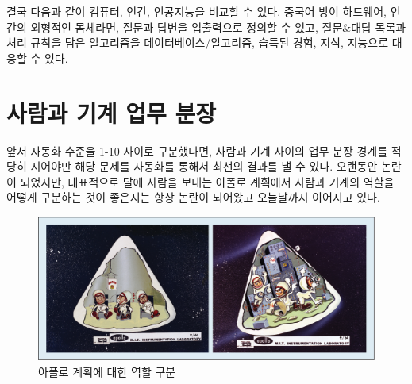 \documentclass[smallextended]{svjour3}       %
\begin{document}
결국 다음과 같이 컴퓨터, 인간, 인공지능을 비교할 수 있다. 중국어 방이
하드웨어, 인간의 외형적인 몸체라면, 질문과 답변을 입출력으로 정의할 수
있고, 질문\&대답 목록과 처리 규칙을 담은 알고리즘을
데이터베이스/알고리즘, 습득된 경험, 지식, 지능으로 대응할 수 있다.

\begin{table}[H]
\centering
{}
\end{table}

\hypertarget{man-human-boundary}{%
\section{사람과 기계 업무 분장}\label{man-human-boundary}}

앞서 자동화 수준을 1-10 사이로 구분했다면, 사람과 기계 사이의 업무 분장
경계를 적당히 지어야만 해당 문제를 자동화를 통해서 최선의 결과를 낼 수
있다. 오랜동안 논란이 되었지만, 대표적으로 달에 사람을 보내는 아폴로
계획에서 사람과 기계의 역할을 어떻게 구분하는 것이 좋은지는 항상 논란이
되어왔고 오늘날까지 이어지고 있다.

\begin{figure}
\hypertarget{id}{%
\centering
\includegraphics[width=1\textwidth,height=\textheight]{fig/man-machine-role-allocation.png}
\caption{아폴로 계획에 대한 역할 구분}\label{id}
}
\end{figure}
\end{document}
